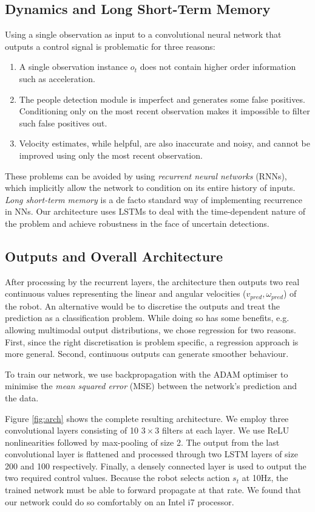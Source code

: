 \documentclass[letterpaper, 10 pt, conference]{ieeeconf}
\begin{document}
\subsection{Dynamics and Long Short-Term Memory}
Using a single observation as input to a convolutional neural network that outputs a control signal is problematic for three reasons:

\begin{enumerate}
\item A single observation instance $o_t$ does not contain higher order information such as  acceleration.
\item The people detection module is imperfect and generates some false positives.  Conditioning only on the most recent observation makes it impossible to filter such false positives out.
\item Velocity estimates, while helpful, are also inaccurate and noisy, and cannot be improved using only the most recent observation.
\end{enumerate}

These problems can be avoided by using \emph{recurrent neural networks} (RNNs), which implicitly allow the network to condition on its entire history of inputs.  \emph{Long short-term memory} \cite{hochreiter1997long} is a de facto standard way of implementing recurrence in NNs. Our architecture uses LSTMs to deal with the time-dependent nature of the problem and achieve robustness in the face of uncertain detections.

\subsection{Outputs and Overall Architecture}
After processing by the recurrent layers, the architecture then outputs two real continuous values representing the linear and angular velocities ($v_{pred},\omega_{pred}$) of the robot. An alternative would be to discretise the outputs and treat the prediction as a classification problem. While doing so has some benefits, e.g. allowing multimodal output distributions, we chose regression for two reasons. First, since the right discretisation is problem specific, a regression approach is more general. Second, continuous outputs can generate smoother behaviour. 

To train our network, we use backpropagation with the ADAM \cite{kingma2014adam} optimiser to minimise the \emph{mean squared error} (MSE) between the network's prediction and the data. 

Figure \ref{fig:arch} shows the complete resulting architecture. We employ three convolutional layers consisting of 10 $3 \times 3$ filters at each layer. We use ReLU nonlinearities followed by max-pooling of size 2. The output from the last convolutional layer is flattened and processed through two LSTM layers of size 200 and 100 respectively. Finally, a densely connected layer is used to output the two required control values. Because the robot selects action $s_t$ at 10Hz, the trained network must be able to forward propagate at that rate.  We found that our network could do so comfortably on an Intel i7 processor.
\end{document}
